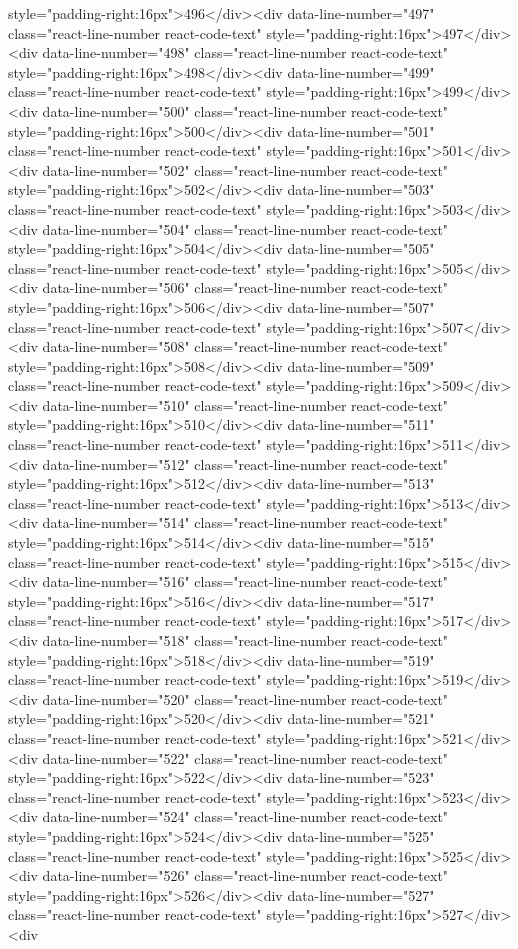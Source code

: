 style="padding-right:16px">496</div><div data-line-number="497" class="react-line-number react-code-text" style="padding-right:16px">497</div><div data-line-number="498" class="react-line-number react-code-text" style="padding-right:16px">498</div><div data-line-number="499" class="react-line-number react-code-text" style="padding-right:16px">499</div><div data-line-number="500" class="react-line-number react-code-text" style="padding-right:16px">500</div><div data-line-number="501" class="react-line-number react-code-text" style="padding-right:16px">501</div><div data-line-number="502" class="react-line-number react-code-text" style="padding-right:16px">502</div><div data-line-number="503" class="react-line-number react-code-text" style="padding-right:16px">503</div><div data-line-number="504" class="react-line-number react-code-text" style="padding-right:16px">504</div><div data-line-number="505" class="react-line-number react-code-text" style="padding-right:16px">505</div><div data-line-number="506" class="react-line-number react-code-text" style="padding-right:16px">506</div><div data-line-number="507" class="react-line-number react-code-text" style="padding-right:16px">507</div><div data-line-number="508" class="react-line-number react-code-text" style="padding-right:16px">508</div><div data-line-number="509" class="react-line-number react-code-text" style="padding-right:16px">509</div><div data-line-number="510" class="react-line-number react-code-text" style="padding-right:16px">510</div><div data-line-number="511" class="react-line-number react-code-text" style="padding-right:16px">511</div><div data-line-number="512" class="react-line-number react-code-text" style="padding-right:16px">512</div><div data-line-number="513" class="react-line-number react-code-text" style="padding-right:16px">513</div><div data-line-number="514" class="react-line-number react-code-text" style="padding-right:16px">514</div><div data-line-number="515" class="react-line-number react-code-text" style="padding-right:16px">515</div><div data-line-number="516" class="react-line-number react-code-text" style="padding-right:16px">516</div><div data-line-number="517" class="react-line-number react-code-text" style="padding-right:16px">517</div><div data-line-number="518" class="react-line-number react-code-text" style="padding-right:16px">518</div><div data-line-number="519" class="react-line-number react-code-text" style="padding-right:16px">519</div><div data-line-number="520" class="react-line-number react-code-text" style="padding-right:16px">520</div><div data-line-number="521" class="react-line-number react-code-text" style="padding-right:16px">521</div><div data-line-number="522" class="react-line-number react-code-text" style="padding-right:16px">522</div><div data-line-number="523" class="react-line-number react-code-text" style="padding-right:16px">523</div><div data-line-number="524" class="react-line-number react-code-text" style="padding-right:16px">524</div><div data-line-number="525" class="react-line-number react-code-text" style="padding-right:16px">525</div><div data-line-number="526" class="react-line-number react-code-text" style="padding-right:16px">526</div><div data-line-number="527" class="react-line-number react-code-text" style="padding-right:16px">527</div><div 